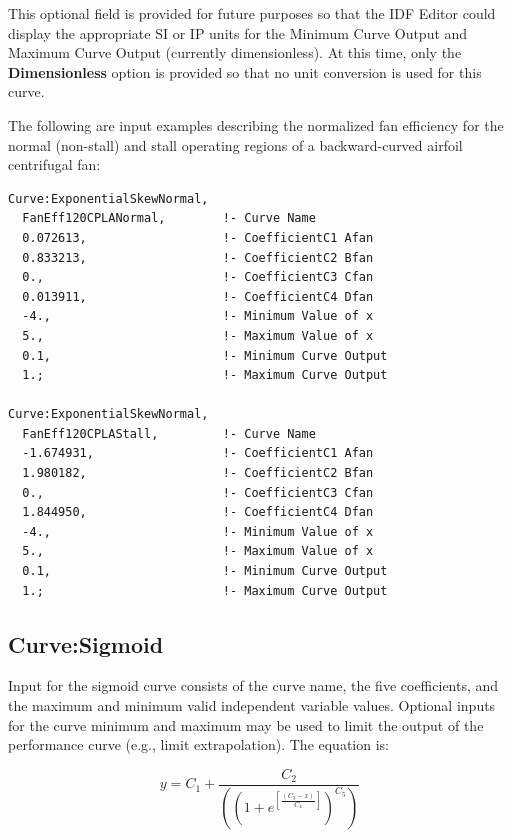 This optional field is provided for future purposes so that the IDF Editor could display the appropriate SI or IP units for the Minimum Curve Output and Maximum Curve Output (currently dimensionless). At this time, only the \textbf{Dimensionless} option is provided so that no unit conversion is used for this curve.

The following are input examples describing the normalized fan efficiency for the normal (non-stall) and stall operating regions of a backward-curved airfoil centrifugal fan:

\begin{lstlisting}
Curve:ExponentialSkewNormal,
  FanEff120CPLANormal,        !- Curve Name
  0.072613,                   !- CoefficientC1 Afan
  0.833213,                   !- CoefficientC2 Bfan
  0.,                         !- CoefficientC3 Cfan
  0.013911,                   !- CoefficientC4 Dfan
  -4.,                        !- Minimum Value of x
  5.,                         !- Maximum Value of x
  0.1,                        !- Minimum Curve Output
  1.;                         !- Maximum Curve Output

Curve:ExponentialSkewNormal,
  FanEff120CPLAStall,         !- Curve Name
  -1.674931,                  !- CoefficientC1 Afan
  1.980182,                   !- CoefficientC2 Bfan
  0.,                         !- CoefficientC3 Cfan
  1.844950,                   !- CoefficientC4 Dfan
  -4.,                        !- Minimum Value of x
  5.,                         !- Maximum Value of x
  0.1,                        !- Minimum Curve Output
  1.;                         !- Maximum Curve Output
\end{lstlisting}

\subsection{Curve:Sigmoid}\label{curvesigmoid}

Input for the sigmoid curve consists of the curve name, the five coefficients, and the maximum and minimum valid independent variable values. Optional inputs for the curve minimum and maximum may be used to limit the output of the performance curve (e.g., limit extrapolation). The equation is:

\begin{equation}
y = {C_1} + \frac{{{C_2}}}{{\left( {{{(1 + {e^{\left[ {\frac{{({C_3} - x)}}{{{C_4}}}} \right]}})}^{{C_5}}}} \right)}}
\end{equation}

